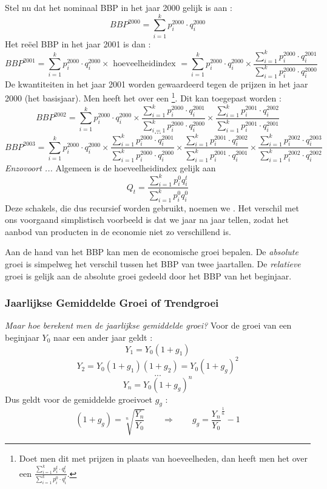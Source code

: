 \par\noindent Stel nu dat het nominaal BBP in het jaar 2000 gelijk is aan :
$$BBP^{2000}=\sum_{i=1}^k p_i^{2000}\cdot q_i^{2000}$$
Het re\"eel BBP in het jaar 2001 is dan :
$$BBP^{2001}=\sum_{i=1}^k p_i^{2000}\cdot q_i^{2000}\times\text{ hoeveelheidindex }=\sum_{i=1}^k p_i^{2000}\cdot q_i^{2000}\times\frac{\sum_{i=1}^k p_i^{2000}\cdot q_i^{2001}}{\sum_{i=1}^k p_i^{2000}\cdot q_i^{2000}}$$
\noindent De kwantiteiten in het jaar 2001 worden gewaardeerd tegen de prijzen in het jaar 2000 (het basisjaar). Men heeft het over een \footnote{Doet men dit met prijzen in plaats van hoeveelheden, dan heeft men het over een  $\frac{\sum_{i=1}^k p_i^{t}\cdot q_i^{t}}{\sum_{i=1}^k p_i^{0}\cdot q_i^{t}}$.}. Dit kan  toegepast worden :
$$BBP^{2002}=\sum_{i=1}^k p_i^{2000}\cdot q_i^{2000}\times\frac{\sum_{i=1}^k p_i^{2000}\cdot q_i^{2001}}{\sum_{i=1}^k p_i^{2000}\cdot q_i^{2000}}\times\frac{\sum_{i=1}^k p_i^{2001}\cdot q_i^{2002}}{\sum_{i=1}^k p_i^{2001}\cdot q_i^{2001}}$$
$$...$$
$$BBP^{2003}=\sum_{i=1}^k p_i^{2000}\cdot q_i^{2000}\times\frac{\sum_{i=1}^k p_i^{2000}\cdot q_i^{2001}}{\sum_{i=1}^k p_i^{2000}\cdot q_i^{2000}}\times\frac{\sum_{i=1}^k p_i^{2001}\cdot q_i^{2002}}{\sum_{i=1}^k p_i^{2001}\cdot q_i^{2001}}\times\frac{\sum_{i=1}^k p_i^{2002}\cdot q_i^{2003}}{\sum_{i=1}^k p_i^{2002}\cdot q_i^{2002}}$$
\textit{Enzovoort ...} Algemeen is de hoeveelheidindex gelijk aan
$$Q_t = \frac{\sum_{i=1}^k p_i^0 q_i^t}{\sum_{i=1}^k p_i^0 q_i^0}$$
Deze schakels, die dus recursief worden gebruikt, noemen we . Het verschil met ons voorgaand simplistisch voorbeeld is dat we jaar na jaar tellen, zodat het aanbod van producten in de economie niet zo verschillend is.\\

\par Aan de hand van het BBP kan men de economische groei bepalen. De \textit{absolute} groei is simpelweg het verschil tussen het BBP van twee jaartallen. De \textit{relatieve} groei is gelijk aan de absolute groei gedeeld door het BBP van het beginjaar. 

\subsubsection{Jaarlijkse Gemiddelde Groei of Trendgroei}\label{sec:h5groei}

\textit{Maar hoe berekent men de jaarlijkse gemiddelde groei?} Voor de groei van een beginjaar $Y_0$ naar een ander jaar geldt :
$$Y_1=Y_0(1+g_1)$$
$$Y_2=Y_0(1+g_1)(1+g_2)=Y_0(1+g_g)^2$$
$$...$$
$$Y_n=Y_0(1+g_g)^n$$
Dus geldt voor de gemiddelde groeivoet $g_g$ :
$$(1+g_g)=\sqrt[n]{\frac{Y_n}{Y_0}}\qquad\Rightarrow\qquad g_g=\frac{Y_n}{Y_0}^{\frac{1}{n}}-1$$ 

